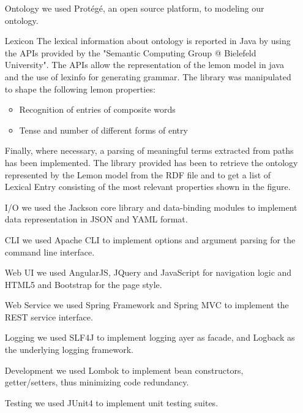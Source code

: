 \begin{itemize}
	\item[Ontology] we used Protégé, an open source platform, to modeling our ontology.
	
	\item[Lexicon] The lexical information about ontology is reported in Java by using the APIs provided by the "Semantic Computing Group @ Bielefeld University". The APIs allow the representation of the lemon model in java and the use of lexinfo for generating grammar. The library was manipulated to shape the following lemon properties: 
	\begin{itemize}
		\item Recognition of entries of composite words
		\item Tense and number of different forms of entry 
	\end{itemize}	
Finally, where necessary, a parsing of meaningful terms extracted from paths has been implemented.
The library provided has been to retrieve the ontology represented by the Lemon model from the RDF file and to get a list of Lexical Entry consisting of the most relevant properties shown in the figure.

	\item[I/O] we used the Jackson core library and data-binding modules to implement data representation in JSON and YAML format.
	
	\item[CLI] we used Apache CLI to implement options and argument parsing for the command line interface.
	
	\item[Web UI] we used AngularJS, JQuery and JavaScript for navigation logic and HTML5 and Bootstrap for the page style.
	
	\item[Web Service] we used Spring Framework and Spring MVC to implement the REST service interface.
	
	\item[Logging] we used SLF4J to implement logging ayer as facade, and Logback as the underlying logging framework.
	
	\item[Development] we used Lombok to implement bean constructors, getter/setters, thus minimizing code redundancy.
	
	\item[Testing] we used JUnit4 to implement unit testing suites.
\end{itemize}

